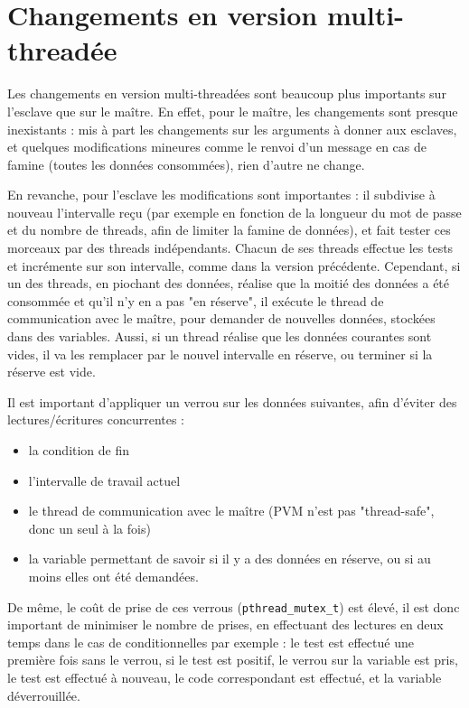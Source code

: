 \documentclass[a4paper,11pt]{article}
\begin{document}
\section{Changements en version multi-threadée}
Les changements en version multi-threadées sont beaucoup plus importants sur l'esclave que sur le maître.
En effet, pour le maître, les changements sont presque inexistants : mis à part les changements sur les arguments à donner aux esclaves, et quelques modifications mineures comme le renvoi d'un message en cas de famine (toutes les données consommées), rien d'autre ne change.

En revanche, pour l'esclave les modifications sont importantes : il subdivise à nouveau l'intervalle reçu (par exemple en fonction de la longueur du mot de passe et du nombre de threads, afin de limiter la famine de données), et fait tester ces morceaux par des threads indépendants.
Chacun de ses threads effectue les tests et incrémente sur son intervalle, comme dans la version précédente. 
Cependant, si un des threads, en piochant des données, réalise que la moitié des données a été consommée et qu'il n'y en a pas "en réserve", il exécute le thread de communication avec le maître, pour demander de nouvelles données, stockées dans des variables.
Aussi, si un thread réalise que les données courantes sont vides, il va les remplacer par le nouvel intervalle en réserve, ou terminer si la réserve est vide.

Il est important d'appliquer un verrou sur les données suivantes, afin d'éviter des lectures/écritures concurrentes :
\begin{itemize}
\item la condition de fin 
\item l'intervalle de travail actuel
\item le thread de communication avec le maître (PVM n'est pas "thread-safe", donc un seul à la fois)
\item la variable permettant de savoir si il y a des données en réserve, ou si au moins elles ont été demandées.
\end{itemize}

De même, le coût de prise de ces verrous (\texttt{pthread\_mutex\_t}) est élevé, il est donc important de minimiser le nombre de prises, en effectuant des lectures en deux temps dans le cas de conditionnelles par exemple :
le test est effectué une première fois sans le verrou, si le test est positif, le verrou sur la variable est pris, le test est effectué à nouveau, le code correspondant est effectué, et la variable déverrouillée.
\end{document}

